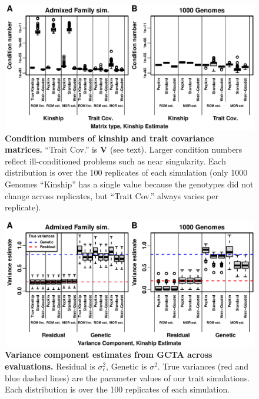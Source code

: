 \documentclass[11pt]{article}
\begin{document}
\begin{figure}[bp!]
  \centering
  \includegraphics[width=\textwidth]{kappa.pdf}
  \caption{
    {\bf Condition numbers of kinship and trait covariance matrices.}
    ``Trait Cov.'' is $\mathbf{V}$ (see text).
    Larger condition numbers reflect ill-conditioned problems such as near singularity.
    Each distribution is over the 100 replicates of each simulation (only 1000 Genomes ``Kinship'' has a single value because the genotypes did not change across replicates, but ``Trait Cov.'' always varies per replicate).
  }
  \label{fig:kappa}
\end{figure}

\begin{figure}[bp!]
  \centering
  \includegraphics[width=\textwidth]{preds-reml-sigmas.pdf}
  \caption{
    {\bf Variance component estimates from GCTA across evaluations.}
    Residual is $\sigma^2_\epsilon$, Genetic is $\sigma^2$.
    True variances (red and blue dashed lines) are the parameter values of our trait simulations.
    Each distribution is over the 100 replicates of each simulation.
  }
  \label{fig:preds-reml-sigmas}
\end{figure}
\end{document}

